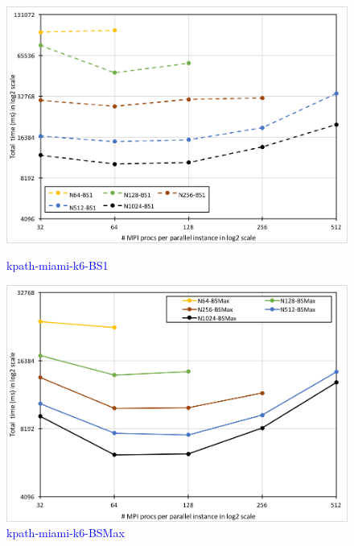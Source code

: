 \begin{figure}[!htb]
\begin{minipage}{0.23\textwidth}
        \includegraphics[width=1\columnwidth]{img/kpath-N1N/miami-k6-BS1.png}
        \caption{\textcolor{blue}{kpath-miami-k6-BS1}}
        \label{fig:fig-kpath-miami-k6-BS1.png}
    \end{minipage}   
    \hspace{0mm}
    \begin{minipage}{0.23\textwidth}
        \centering
        \includegraphics[width=1\columnwidth]{img/kpath-N1N/miami-k6-BSMax.png}
        \caption{\textcolor{blue}{kpath-miami-k6-BSMax}}
        \label{fig:fig-kpath-miami-k6-BSMax.png}
    \end{minipage}   
\end{figure}

